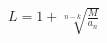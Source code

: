 \documentclass[12pt]{article}
\begin{document}
$ \begin{equation*}L=1+\sqrt[n-k]{\frac{M}{a_n}}\end{equation*} $
\end{document}
